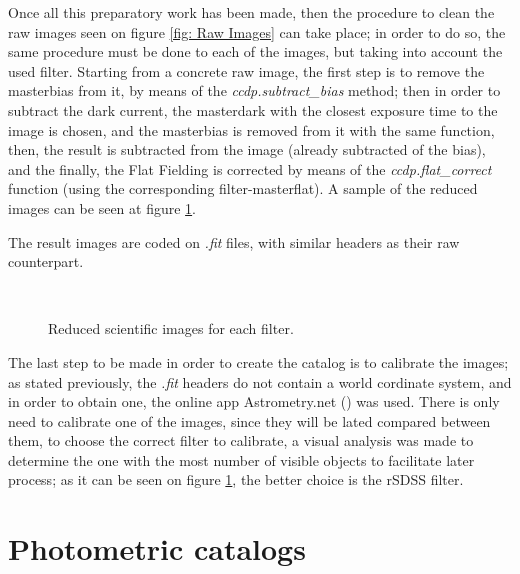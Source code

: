 \documentclass{aa}
\begin{document}
    Once all this preparatory work has been made, then the procedure to clean the raw images seen on figure \ref{fig: Raw  Images} can take place; in order to do so, the same procedure must be done to each of the images, but taking into account the used filter. Starting from a concrete raw image, the first step is to remove the masterbias from it, by means of the \textit{ccdp.subtract\_bias} method; then in order to subtract the dark current, the masterdark with the closest exposure time to the image is chosen, and the masterbias is removed from it with the same function, then, the result is subtracted from the image (already subtracted of the bias), and the finally, the Flat Fielding is corrected by means of the \textit{ccdp.flat\_correct} function (using the corresponding filter-masterflat). A sample of the reduced images can be seen at figure \ref{fig: Reduced Images}.

    The result images are coded on \textit{.fit} files, with similar headers as their raw counterpart. 
    
    \begin{figure}[H]
      \centering
      \quad
      \\
      \quad
      \caption{Reduced scientific images for each filter.}
      \label{fig: Reduced Images}
    \end{figure}

    The last step to be made in order to create the catalog is to calibrate the images; as stated previously, the \textit{.fit} headers do not contain a world cordinate system, and in order to obtain one, the online app Astrometry.net (\cite{Astrometry}) was used. There is only need to calibrate one of the images, since they will be lated compared between them, to choose the correct filter to calibrate, a visual analysis was made to determine the one with the most number of visible objects to facilitate later process; as it can be seen on figure \ref{fig: Reduced Images}, the better choice is the rSDSS filter.

    \section{Photometric catalogs}\label{sec: Photometric catalogs}
\end{document}
